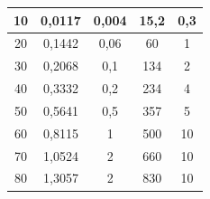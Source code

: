 \documentclass[a4paper, 12pt]{article}%
\begin{document}
\begin{table}[h!]
\begin{center}
\begin{tabular}{|c|c|c|c|c|}
10             & 0,0117                                          & 0,004                                                                  & 15,2                                                            & 0,3                                                                      \\ \hline
20             & 0,1442                                          & 0,06                                                                   & 60                                                              & 1                                                                        \\ \hline
30             & 0,2068                                          & 0,1                                                                    & 134                                                             & 2                                                                        \\ \hline
40             & 0,3332                                          & 0,2                                                                    & 234                                                             & 4                                                                        \\ \hline
50             & 0,5641                                          & 0,5                                                                    & 357                                                             & 5                                                                        \\ \hline
60             & 0,8115                                          & 1                                                                      & 500                                                             & 10                                                                       \\ \hline
70             & 1,0524                                          & 2                                                                      & 660                                                             & 10                                                                       \\ \hline
80             & 1,3057                                          & 2                                                                      & 830                                                             & 10                                                                       \\ \hline

\end{tabular}
\end{center}
\end{table}
\end{document}
